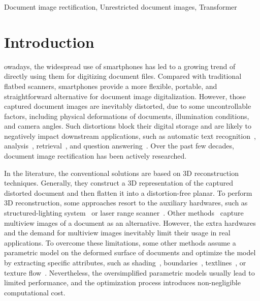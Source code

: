 \documentclass[lettersize,journal]{IEEEtran}
\begin{document}
\begin{IEEEkeywords}
Document image rectification, Unrestricted document images, Transformer
\end{IEEEkeywords}

\section{Introduction}
owadays, the widespread use of smartphones has led to a growing trend of directly using them for digitizing document files. 
Compared with traditional flatbed scanners,
smartphones provide a more flexible, portable, and straightforward alternative for document image digitalization.
However, 
those captured document images are inevitably distorted,
due to some uncontrollable factors, including physical deformations of documents, illumination conditions, and camera angles. 
Such distortions block their digital storage and are likely to negatively impact downstream applications, such as automatic text recognition~\cite{ciardiello1988experimental,wang2011end,lat2018enhancing,peng2022recognition}, analysis~\cite{yuan2019interpreting,zhang2022multimodal,kim2022ocr}, retrieval~\cite{salton1991developments,yang2008harmonizing,liu2023end}, and question answering~\cite{mathew2021docvqa,nie2012beyond}.
Over the past few decades,
document image rectification has been actively researched. 

In the literature, the conventional solutions are based on 3D reconstruction techniques.
Generally, they construct a 3D representation of the captured distorted document and then flatten it into a distortion-free planar.
To perform 3D reconstruction, some approaches resort to the auxiliary hardwares, such as structured-lighting system~\cite{brown2004image,937649,6909892} or laser range scanner~\cite{4407722}.
Other methods~\cite{4916075,yamashita2004shape,tsoi2007multi,tsoi2004geometric,Shaodi} capture multiview images of a document as an alternative.
However, the extra hardwares and the demand for multiview images inevitably limit their usage in real applications.
To overcome these limitations,
some other methods assume a parametric model on the deformed surface of documents 
and optimize the model by extracting specific attributes, such as
shading~\cite{1561180,wada1997shape}, boundaries~\cite{6628653}, textlines~\cite{1227630,958227,wu2002document,meng2011metric,luo2022geometric}, or texture flow~\cite{liang2008geometric}.
Nevertheless, the oversimplified parametric models 
usually lead to limited performance, and the optimization process introduces non-negligible computational cost.
\end{document}
